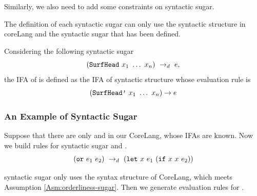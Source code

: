 Similarly, we also need to add some constraints on syntactic sugar.

\begin{Asm}
\label{Asm:orderliness-sugar}
The definition of each syntactic sugar can only use the syntactic structure in coreLang and the syntactic sugar that has been defined.
\end{Asm}

\begin{Def}
\label{def:ifa-sugar}
Considering the following syntactic sugar 
\[
(\mbox{\tt SurfHead}~x_1~\ldots~x_n) ~\rightarrow_d~ e,
\] 
the IFA of  is defined as the IFA of syntactic structure  whose evaluation rule is
\[
(\mbox{\tt SurfHead'}~x_1~\ldots~x_n) \to e
\]

\end{Def}

\subsubsection{An Example of Syntactic Sugar}

Suppose that there are only  and  in our CoreLang, whose IFAs are known. Now we build rules for syntactic sugar  and .
\[
(\mbox{\tt or}~e_1~e_2) ~\rightarrow_d~ (\mbox{\tt let}~x~e_1~(\mbox{\tt if}~x~x~e_2)) 
\]

 syntactic sugar only uses the syntax structure of CoreLang, which meets Assumption \ref{Asm:orderliness-sugar}. Then we generate evaluation rules for .

